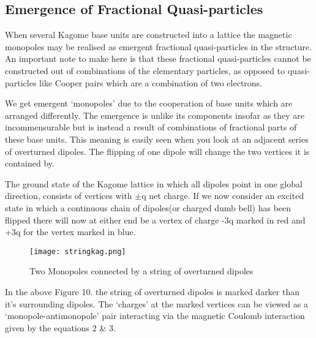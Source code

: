 \subsection{Emergence of Fractional Quasi-particles}
When several Kagome base units are constructed into a lattice the magnetic monopoles may be realised as emergent fractional quasi-particles in the structure.  An important note to make here is that these fractional quasi-particles cannot be constructed out of combinations of the elementary particles, as opposed to quasi-particles like Cooper pairs which are a combination of two electrons.
\par
We get emergent `monopoles' due to the cooperation of base units which are arranged differently.  The emergence is unlike its components insofar as they are incommensurable but is instead a result of combinations of fractional parts of these base units. This meaning is easily seen when you look at an adjacent series of overturned dipoles.  The flipping of one dipole will change the two vertices it is contained by.
\par
The ground state of the Kagome lattice in which all dipoles point in one global direction, consists of vertices with $\pm$q net charge. If we now consider an excited state in which a continuous chain of dipoles(or charged dumb bell) has been flipped there will now at either end be a vertex of charge -3q marked in red and +3q for the vertex marked in blue.
\par
\begin{figure}[ht!]
    \begin{center}
        \texttt{[image: stringkag.png]}
        \caption[Overturned string of dipoles]{Two Monopoles connected by a string of overturned dipoles}
        \label{fig:gf9}
    \end{center}
\end{figure}
In the above Figure 10. the string of overturned dipoles is marked darker than it's surrounding dipoles.  The `charges' at the marked vertices can be viewed as a `monopole-antimonopole' pair interacting via the magnetic Coulomb interaction given by the equations 2 \& 3.
\clearpage
